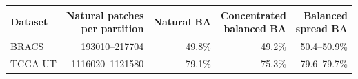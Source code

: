 \begin{tabular}{lrrrr}
\toprule
Dataset & \shortstack{Natural patches\\per partition} & Natural BA & \shortstack{Concentrated\\balanced BA} & \shortstack{Balanced\\spread BA} \\
\midrule
BRACS & \num{193010}--\num{217704} & \num{49.8}\% & \num{49.2}\% & \num{50.4}--\num{50.9}\% \\
TCGA-UT & \num{1116020}--\num{1121580} & \num{79.1}\% & \num{75.3}\% & \num{79.6}--\num{79.7}\% \\
\bottomrule
\end{tabular}
